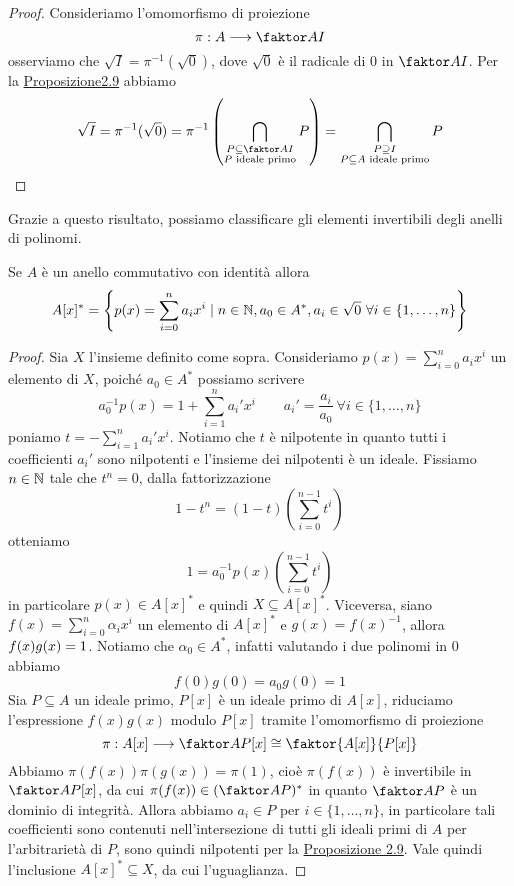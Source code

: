 \documentclass[11pt]{scrartcl}
\begin{document}
\begin{proof}
    Consideriamo l'omomorfismo di proiezione
    \[
        \pi: A\longrightarrow \faktor A I
    \]
    osserviamo che $\sqrt{I} = \pi^{-1}(\sqrt{0})$, dove $\sqrt{0}$ è il radicale di 
    $0$ in $\faktor A I$. Per la \hyperref[prop2.9]{Proposizione2.9}
    abbiamo
    \[
        \sqrt{I} = \pi^{-1}(\sqrt{0}) = \pi^{-1}\left(\bigcap_{\substack{
            P\subseteq \faktor A I\\ P \text{ ideale primo}}} P\right) = 
            \bigcap_{\substack{P\supseteq I\\P \subseteq A\text{ ideale primo}}}P
    \]
\end{proof}

Grazie a questo risultato, possiamo classificare gli elementi invertibili 
degli anelli di polinomi.

\begin{proposition}
    Se $A$ è un anello commutativo con identità allora 
    \[
        A[x]^* = \left\{p(x) = \sum_{i = 0}^n a_ix^i\mid n \in \mathbb N,
        a_0 \in A^*, a_i \in \sqrt{0}~\forall i \in \{1, \ldots, n\}\right\}
    \]
\end{proposition}

\begin{proof}
    Sia $X$ l'insieme definito come sopra. Consideriamo 
    $p(x) = \displaystyle\sum_{i = 0}^n a_i x^i$ un elemento di $X$, poiché
    $a_0 \in A^*$ possiamo scrivere 
    \[
        a_0^{-1}p(x) = 1 + \sum_{i = 1}^n a_i'x^i \qquad 
        a_i' = \frac{a_i}{a_0}~\forall i \in \{1, \ldots,n\}
    \]
    poniamo $t = \displaystyle -\sum_{i = 1}^n a_i'x^i$. Notiamo che $t$ è
    nilpotente in quanto tutti i coefficienti $a_i'$ sono nilpotenti e l'insieme
    dei nilpotenti è un ideale. Fissiamo $n \in \mathbb N$ tale che $t^n = 0$, 
    dalla fattorizzazione 
    \[
        1 - t^n = (1 - t)\left(\sum_{i = 0}^{n - 1}t^i\right)
    \]
    otteniamo 
    \[
        1 = a_0^{-1}p(x)\left(\sum_{i = 0}^{n - 1}t^i\right)
    \]
    in particolare $p(x) \in A[x]^*$ e quindi $X \subseteq A[x]^*$.\newline
    Viceversa, siano $f(x) = \displaystyle\sum_{i = 0}^n\alpha_ix^i$ un 
    elemento di $A[x]^*$ e $g(x) = f(x)^{-1}$, allora $f(x)g(x) = \nolinebreak 1$.
    Notiamo che $\alpha_0 \in A^*$, infatti valutando i due polinomi in 0
    abbiamo
    \[
        f(0)g(0) = a_0g(0) = 1
    \]
    Sia $P \subseteq A$ un ideale primo, $P[x]$ è un ideale primo di $A[x]$,
    riduciamo l'espressione $f(x)g(x)$ modulo $P[x]$ tramite l'omomorfismo 
    di proiezione
    \[
        \pi: A[x]\longrightarrow \faktor A P [x] \cong \faktor{A[x]}{P[x]}
    \]
    Abbiamo $\pi(f(x))\pi(g(x)) = \pi(1)$, cioè $\pi(f(x))$ è invertibile in 
    $\faktor A P [x]$, da cui $\pi(f(x)) \in (\faktor A P)^*$ in quanto $\faktor A P$
    è un dominio di integrità. Allora abbiamo $a_i \in P$ per $i \in \{1, \ldots, n\}$,
    in particolare tali coefficienti sono contenuti nell'intersezione di tutti
    gli ideali primi di $A$ per l'arbitrarietà di $P$, sono quindi nilpotenti
    per la \hyperref[prop2.9]{Proposizione 2.9}. Vale quindi l'inclusione 
    $A[x]^* \subseteq X$, da cui l'uguaglianza.
\end{proof}
\end{document}
